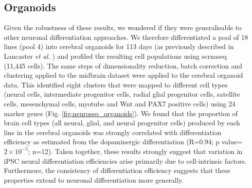 \subsection{Organoids}
Given the robustness of these results, we wondered if they were generalisable to other neuronal differentiation approaches. 
We therefore differentiated a pool of 18 lines (pool 4) into cerebral organoids for 113 days (as previously described in Lancaster \textit{et al}. \cite{lancaster2017guided}) and profiled the resulting cell populations using \gls{scrnaseq} (11,445 cells). 
The same steps of dimensionality reduction, batch correction and clustering applied to the midbrain dataset were applied to the cerebral organoid data. 
This identified eight clusters that were mapped to different cell types (neural cells, intermediate progenitor cells, radial glial progenitor cells, satellite cells, mesenchymal cells, myotube and Wnt and PAX7 positive cells) using 24 marker genes (Fig. \ref{fig:neuroseq_organoids}).
We found that the proportion of brain cell types (all neural, glial, and neural progenitor cells) produced by each line in the cerebral organoids was strongly correlated with differentiation efficiency as estimated from the dopaminergic differentiation (R=0.94; p value=$2 \times 10^{-5}$; n=12). 
Taken together, these results strongly suggest that variation in iPSC neural differentiation efficiencies arise primarily due to cell-intrinsic factors. 
Furthermore, the consistency of differentiation efficiency suggests that these properties extend to neuronal differentiation more generally.

